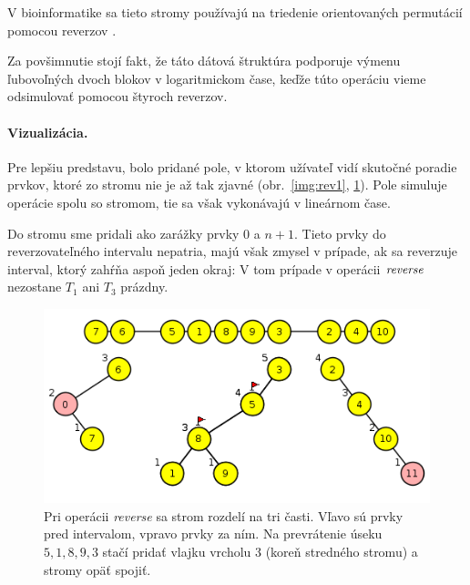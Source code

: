 V bioinformatike sa tieto stromy používajú na triedenie orientovaných permutácií
pomocou reverzov \citep{reversals,reversals2}.

Za povšimnutie stojí fakt, že táto dátová štruktúra podporuje výmenu ľubovoľných dvoch blokov
v logaritmickom čase, keďže túto operáciu vieme odsimulovať pomocou štyroch reverzov.

\paragraph{Vizualizácia.}
Pre lepšiu predstavu, bolo pridané pole, v ktorom užívateľ vidí skutočné poradie prvkov, ktoré
zo stromu nie je až tak zjavné (obr.~\ref{img:rev1}, \ref{img:rev2}). Pole simuluje operácie spolu so stromom,
tie sa však vykonávajú v lineárnom čase.

Do stromu sme pridali ako zarážky prvky 0 a $n+1$. Tieto prvky do reverzovateľného
intervalu nepatria, majú však zmysel v prípade, ak sa reverzuje interval, ktorý zahŕňa
aspoň jeden okraj: V tom prípade v operácii $\mathop{\mathit{reverse}}$ nezostane $T_1$ ani $T_3$ prázdny. 

\begin{figure}
\includegraphics[width=\columnwidth]{obrazky/rev2.png}
\caption{Pri operácii \emph{reverse} sa strom rozdelí na tri časti. 
Vľavo sú prvky pred intervalom, vpravo prvky za ním. 
Na prevrátenie úseku $5,1,8,9,3$ stačí pridať vlajku vrcholu 3 (koreň stredného stromu)
a stromy opäť spojiť.}
\label{img:rev2}
\end{figure}

